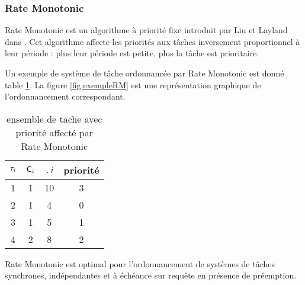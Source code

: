 \subsubsection{Rate Monotonic \cite{LL73}}
Rate Monotonic est un algorithme à priorité fixe introduit par Liu et
Layland dans \cite{LL73}. Cet algorithme affecte les priorités aux
tâches inversement proportionnel à leur période : plus leur période
est petite, plus la tâche est prioritaire.

Un exemple de système de tâche ordonnancée par Rate
Monotonic est donné table \ref{tab:exempleRM}. La figure
\ref{fig:exempleRM} est une représentation graphique de
l'ordonnancement correspondant.

\begin{table}[h]
\begin{center}
\begin{tabular}{|c|c|c|c|}
 \hline $\tau_{i}$ & $\mathsf{C}_{i}$ & $\period{i}$ & priorité\\ 
 \hline 1 & 1 & 10 & 3\\ 
 \hline 2 & 1 & 4 & 0\\ 
 \hline 3 & 1 & 5 & 1\\ 
 \hline 4 & 2 & 8 & 2\\ 
 \hline
 \end{tabular}
\end{center}
\caption{ensemble de tache avec priorité affecté par Rate Monotonic} \label{tab:exempleRM}
\end{table}


\begin{theoreme}
  Rate Monotonic est optimal pour l'ordonnancement de systèmes de
  tâches synchrones, indépendantes et à échéance sur requête en
  présence de préemption.
\end{theoreme}

